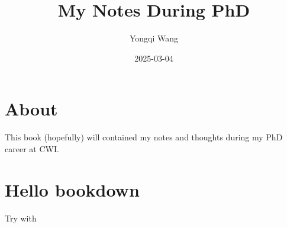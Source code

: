 \documentclass[
]{book}
\title{My Notes During PhD}
\author{Yongqi Wang}
\date{2025-03-04}
\begin{document}
\maketitle

{
\setcounter{tocdepth}{1}
\tableofcontents
}
\chapter{About}\label{about}

This book (hopefully) will contained my notes and thoughts during my PhD career at CWI.

\chapter{Hello bookdown}\label{hello-bookdown}

Try with \citet{xie2015}

  
\end{document}
